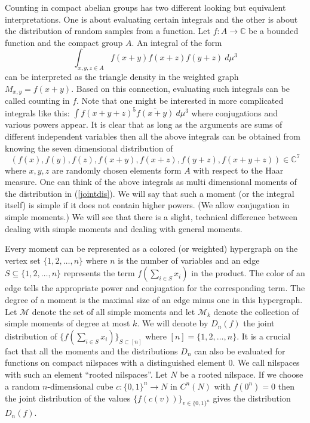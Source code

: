 \documentclass [11pt] {article}
\begin{document}
Counting in compact abelian groups has two different looking but equivalent interpretations. One is about evaluating certain integrals and the other is about the distribution of random samples from a function.
Let $f:A\rightarrow\mathbb{C}$ be a bounded function and the compact group $A$.
An integral of the form 
$$\int_{x,y,z\in A} f(x+y)f(x+z)f(y+z)~d\mu^3$$
can be interpreted as the triangle density in the weighted graph $M_{x,y}=f(x+y)$.
Based on this connection, evaluating such integrals can be called counting in $f$.
Note that one might be interested in more complicated integrals like this:
$\int f(x+y+z)^5\overline{f(x+y)}~d\mu^3$
where conjugations and various powers appear. 
It is clear that as long as the arguments are sums of different independent variables then all the above integrals can be obtained from knowing the seven dimensional distribution of
\begin{equation}\label{jointdis}
(f(x),f(y),f(z),f(x+y),f(x+z),f(y+z),f(x+y+z))\in\mathbb{C}^7
\end{equation}
where $x,y,z$ are randomly chosen elements form $A$ with respect to the Haar measure.
One can think of the above integrals as multi dimensional moments of the distribution in (\ref{jointdis}).
We will say that such a moment (or the integral itself) is simple if it does not contain higher powers. (We allow conjugation in simple moments.)
We will see that there is a slight, technical difference between dealing with simple moments and dealing with general moments.

Every moment can be represented as a colored (or weighted) hypergraph on the vertex set $\{1,2,\dots,n\}$ where $n$ is the number of variables and an edge $S\subseteq\{1,2,\dots,n\}$ represents the term $f(\sum_{i\in S}x_i)$ in the product.
The color of an edge tells the appropriate power and conjugation for the corresponding term.
The degree of a moment is the maximal size of an edge minus one in this hypergraph.
Let $\mathcal{M}$ denote the set of all simple moments and let $\mathcal{M}_k$ denote the collection of simple moments of degree at most $k$. 
We will denote by $D_n(f)$ the joint distribution of $\{f(\sum_{i\in S} x_i)\}_{S\subset[n]}$ where $[n]=\{1,2,\dots,n\}$.
It is a crucial fact that all the moments and the distributions $D_n$ can also be evaluated for functions on compact nilspaces with a distinguished element $0$. 
We call nilspaces with such an element ``rooted nilspaces''.
Let $N$ be a rooted nilspace. If we choose a random $n$-dimensional cube $c:\{0,1\}^n\rightarrow N$ in $C^n(N)$ with $f(0^n)=0$ then the joint distribution of the values $\{f(c(v))\}_{v\in\{0,1\}^n}$ gives the distribution $D_n(f)$. 
\end{document}
